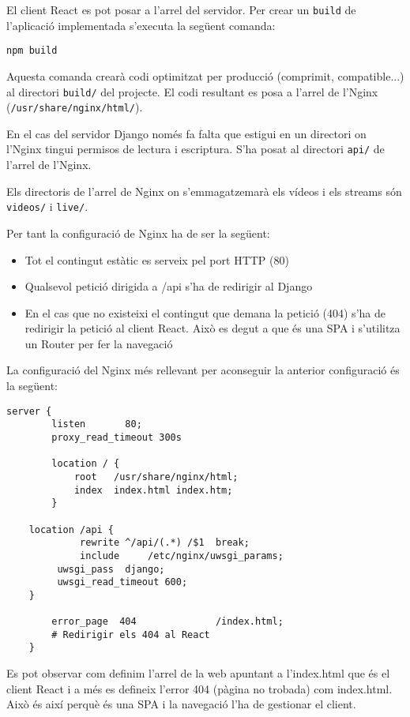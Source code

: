 \documentclass[12pt, titlepage]{article}
\begin{document}
El client React es pot posar a l'arrel del servidor. Per crear un \verb|build| de
l'aplicació implementada s'executa la següent comanda:

\begin{lstlisting}
npm build
\end{lstlisting}

Aquesta comanda crearà codi optimitzat per producció (comprimit, compatible...)
al directori \verb|build/| del projecte. El codi resultant es posa a l'arrel de l'Nginx
(\verb|/usr/share/nginx/html/|).

En el cas del servidor Django només fa falta que estigui en un directori on
l'Nginx tingui permisos de lectura i escriptura. S'ha posat al directori \verb|api/|
de l'arrel de l'Nginx.

Els directoris de l'arrel de Nginx on s'emmagatzemarà els vídeos i els streams
són \verb|videos/| i \verb|live/|.

Per tant la configuració de Nginx ha de ser la següent:

\begin{itemize}
\item Tot el contingut estàtic es serveix pel port HTTP (80)
\item Qualsevol petició dirigida a /api s'ha de redirigir al Django
\item En el cas que no existeixi el contingut que demana la petició (404) s'ha
de redirigir la petició al client React. Això es degut a que és una SPA i s'utilitza
un Router per fer la navegació
\end{itemize}

La configuració del Nginx més rellevant per aconseguir la anterior configuració
és la següent:

\begin{lstlisting}[breaklines]
server {
        listen       80;
        proxy_read_timeout 300s

        location / {
            root   /usr/share/nginx/html;
            index  index.html index.htm;
        }

	location /api {
             rewrite ^/api/(.*) /$1  break;
     	     include     /etc/nginx/uwsgi_params;
	     uwsgi_pass  django;
	     uwsgi_read_timeout 600;
	}

        error_page  404              /index.html;
        # Redirigir els 404 al React
    }
\end{lstlisting}

Es pot observar com definim l'arrel de la web apuntant a l'index.html que és el
client React i a més es defineix l'error 404 (pàgina no trobada) com index.html.
Això és així perquè és una SPA i la navegació l'ha de gestionar el client.
\end{document}
